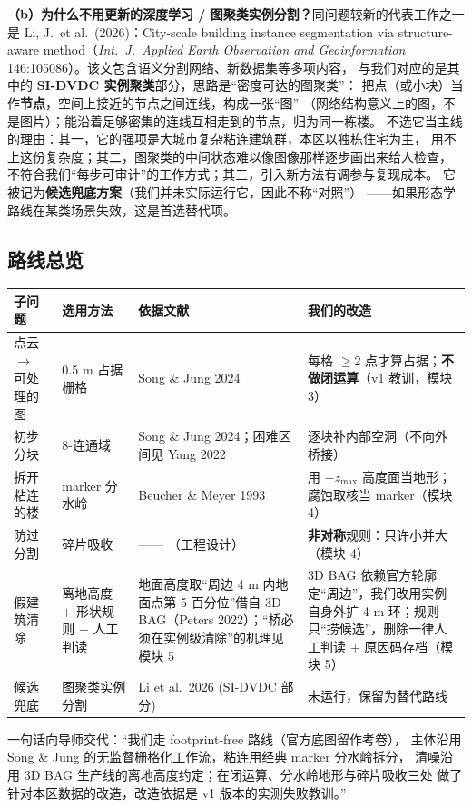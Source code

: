 \textbf{（b）为什么不用更新的深度学习 / 图聚类实例分割？}同问题较新的代表工作之一是
Li, J.\ et al.\ (2026)：City-scale building instance segmentation via
structure-aware method（\textit{Int.\ J.\ Applied Earth Observation and
Geoinformation} 146:105086）。该文包含语义分割网络、新数据集等多项内容，
与我们对应的是其中的 \textbf{SI-DVDC 实例聚类}部分，思路是``密度可达的图聚类''：
把点（或小块）当作\textbf{节点}，空间上接近的节点之间连线，构成一张``图''
（网络结构意义上的图，不是图片）；能沿着足够密集的连线互相走到的节点，归为同一栋楼。
不选它当主线的理由：其一，它的强项是大城市复杂粘连建筑群，本区以独栋住宅为主，
用不上这份复杂度；其二，图聚类的中间状态难以像图像那样逐步画出来给人检查，
不符合我们``每步可审计''的工作方式；其三，引入新方法有调参与复现成本。
它被记为\textbf{候选兜底方案}（我们并未实际运行它，因此不称``对照''）
——如果形态学路线在某类场景失效，这是首选替代项。

\subsection{路线总览}

\begin{center}
\small
\begin{tabular}{p{3.1cm}p{3.6cm}p{3.9cm}p{3.6cm}}
\toprule
子问题 & 选用方法 & 依据文献 & 我们的改造 \\
\midrule
点云 $\to$ 可处理的图 & 0.5 m 占据栅格 & Song \& Jung 2024 & 每格 $\geq$2 点才算占据；\textbf{不做闭运算}（v1 教训，模块 3） \\
初步分块 & 8-连通域 & Song \& Jung 2024；困难区间见 Yang 2022 & 逐块补内部空洞（不向外桥接） \\
拆开粘连的楼 & marker 分水岭 & Beucher \& Meyer 1993 & 用 $-z_{\max}$ 高度面当地形；腐蚀取核当 marker（模块 4） \\
防过分割 & 碎片吸收 & —— （工程设计） & \textbf{非对称}规则：只许小并大（模块 4） \\
假建筑清除 & 离地高度 + 形状规则 + 人工判读 & 地面高度取``周边 4 m 内地面点第 5 百分位''借自 3D BAG（Peters 2022）；``桥必须在实例级清除''的机理见模块 5 & 3D BAG 依赖官方轮廓定``周边''，我们改用实例自身外扩 4 m 环；规则只``捞候选''，删除一律人工判读 + 原因码存档（模块 5） \\
候选兜底 & 图聚类实例分割 & Li et al.\ 2026 (SI-DVDC 部分) & 未运行，保留为替代路线 \\
\bottomrule
\end{tabular}
\end{center}

\begin{plainbox}[：模块 2 小结（汇报口径）]
一句话向导师交代：``我们走 footprint-free 路线（官方底图留作考卷），
主体沿用 Song \& Jung 的无监督栅格化工作流，粘连用经典 marker 分水岭拆分，
清噪沿用 3D BAG 生产线的离地高度约定；在闭运算、分水岭地形与碎片吸收三处
做了针对本区数据的改造，改造依据是 v1 版本的实测失败教训。''
\end{plainbox}

